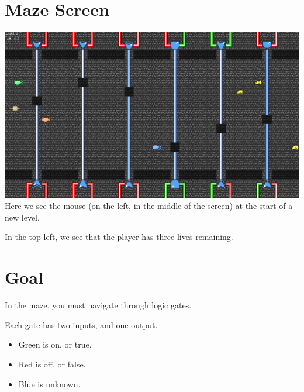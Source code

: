 \documentclass[12pt]{book}
\begin{document}
		\section{Maze Screen}
			\includegraphics[width=\textwidth]{MazeScreen}
			\\
			Here we see the mouse (on the left, in the middle of the screen) at the start of a new level.

			In the top left, we see that the player has three lives remaining.
		\section{Goal}
			In the maze, you must navigate through logic gates.

			Each gate has two inputs, and one output.
			\begin{itemize}
				\item \textcolor{on}{Green is on, or true.}
				\item \textcolor{off}{Red is off, or false.}
				\item \textcolor{unknown}{Blue is unknown.}
			\end{itemize}
\end{document}
